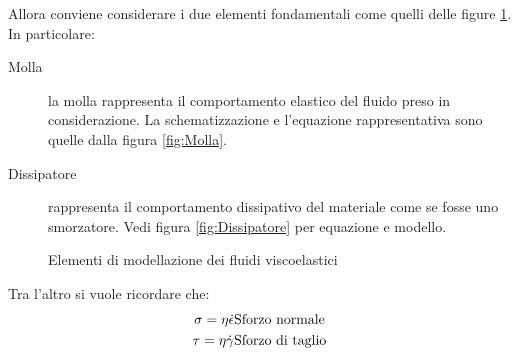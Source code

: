 Allora conviene considerare i due elementi fondamentali come quelli delle figure \ref{fig:FluidiViscoelastici}.
In particolare:
\begin{description}
\item[Molla] la molla rappresenta il comportamento elastico del fluido preso in considerazione. La schematizzazione e l'equazione rappresentativa sono quelle dalla figura \ref{fig:Molla}.
\item[Dissipatore] rappresenta il comportamento dissipativo del materiale come se fosse uno smorzatore. Vedi figura \ref{fig:Dissipatore} per equazione e modello.
\end{description}

\begin{figure}
\centering
{}\quad
{}	
\caption{Elementi di modellazione dei fluidi viscoelastici}
\label{fig:FluidiViscoelastici}	
\end{figure}

Tra l'altro si vuole ricordare che:
\begin{equation}
\begin{split}
\sigma = \eta \dot{\epsilon} &\textup{Sforzo normale}\\
\tau = \eta \dot{\gamma} &\textup{Sforzo di taglio}
\end{split}
\end{equation}

